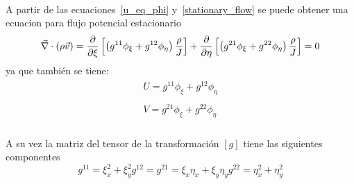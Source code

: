 \documentclass[letterpaper, openright, 12pt]{book}
\begin{document}
    \paragraph*{}
        A partir de las ecuaciones~\ref{u_eq_phi} y~\ref{stationary_flow} se
        puede obtener una ecuacion para flujo potencial estacionario
        \begin{equation}
            \vec{\nabla} \cdot \left( \rho \vec{v} \right)
                    = \pdv{\xi} \left[ \left(g^{11}\phi_{\xi}
                            + g^{12} \phi_{\eta} \right) \frac{\rho}{J} \right]
                        + \pdv{\eta} \left[ \left(g^{21} \phi_{\xi}
                            + g^{22} \phi_{\eta} \right) \frac{\rho}{J} \right]
                    = 0
        \end{equation}
        ya que también se tiene:
        \begin{align}
            \begin{aligned}
            U = g^{11} \phi_{\xi} + g^{12} \phi_{\eta}
            \label{eq_potencial_1}
            \end{aligned}
            \\
            \begin{aligned}
            V = g^{21} \phi_{\xi} + g^{22} \phi_{\eta}
            \label{eq_potencial_2}
            \end{aligned}
        \end{align}

    \paragraph*{}
        A su vez la matriz del tensor de la transformación $[g]$ tiene las
        siguientes componentes
        \begin{subequations}
            \begin{equation}
                g^{11} = \xi_{x}^{2} + \xi_{y}^2
            \end{equation}
            \begin{equation}
                    g^{12} = g^{21} = \xi_{x} \eta_{x} + \xi_{y} \eta_{y}
            \end{equation}
            \begin{equation}
                g^{22} = \eta_{x}^{2} + \eta_{y}^2
            \end{equation}
        \end{subequations}
\end{document}
